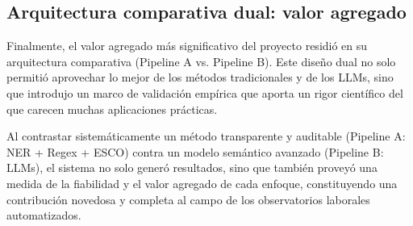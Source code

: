 \subsection{Arquitectura comparativa dual: valor agregado}

Finalmente, el valor agregado más significativo del proyecto residió en su arquitectura comparativa (Pipeline A vs. Pipeline B). Este diseño dual no solo permitió aprovechar lo mejor de los métodos tradicionales y de los LLMs, sino que introdujo un marco de validación empírica que aporta un rigor científico del que carecen muchas aplicaciones prácticas.

Al contrastar sistemáticamente un método transparente y auditable (Pipeline A: NER + Regex + ESCO) contra un modelo semántico avanzado (Pipeline B: LLMs), el sistema no solo generó resultados, sino que también proveyó una medida de la fiabilidad y el valor agregado de cada enfoque, constituyendo una contribución novedosa y completa al campo de los observatorios laborales automatizados.
